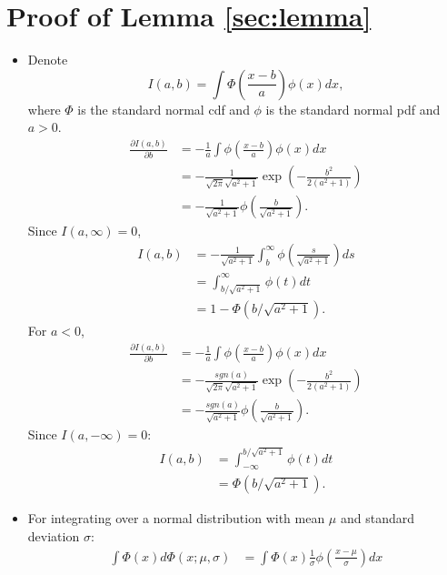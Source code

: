 \documentclass[12pt]{article}
\begin{document}
\section{Proof of Lemma \ref{sec:lemma}}
\label{sec:proof}
\begin{itemize}
\item Denote
  \begin{displaymath}
    I(a,b) = \int \Phi \left( \frac{x-b}{a} \right)\phi(x) dx ,
  \end{displaymath}
  where $\Phi$ is the standard normal cdf and $\phi$ is the standard
  normal pdf and $a > 0$.
  \begin{align*}
    \frac{\partial I(a,b)}{\partial b} & = - \frac{1}{a} \int \phi \left( \frac{x-b}{a} \right) \phi(x) dx \\
    & = - \frac{1}{\sqrt{2 \pi} \sqrt{a^2+1}} \exp \left( - \frac{b^2}{2(a^2+1)} \right)\\
    & = -\frac{1}{\sqrt{a^2+1}} \phi \left( \frac{b}{\sqrt{a^2+1}}
    \right).
  \end{align*}
  Since $I(a, \infty) = 0$,
  \begin{align}
    I(a,b) &= - \frac{1}{\sqrt{a^2+1}} \int_b^{\infty} \phi \left( \frac{s}{\sqrt{a^2+1}} \right) ds \nonumber \\
    &= \int_{b/\sqrt{a^2+1}}^{\infty} \phi(t) dt \nonumber\\
    \label{eq:int}
    & = 1- \Phi(b/\sqrt{a^2+1}).
  \end{align}
  For $a < 0$,
  \begin{align*}
    \frac{\partial I(a,b)}{\partial b} & = - \frac{1}{a} \int \phi \left( \frac{x-b}{a} \right) \phi(x) dx \\
    & = - \frac{sgn(a)}{\sqrt{2 \pi} \sqrt{a^2+1}} \exp \left( - \frac{b^2}{2(a^2+1)} \right)\\
    & = -\frac{sgn(a)}{\sqrt{a^2+1}} \phi \left(
      \frac{b}{\sqrt{a^2+1}} \right).
  \end{align*}
  Since $I(a, -\infty) = 0$:
  \begin{align}
    I(a,b) &= \int^{b/\sqrt{a^2+1}}_{-\infty} \phi(t) dt \nonumber\\
    \label{eq:intneg}
    & = \Phi(b/\sqrt{a^2+1}).
  \end{align}
\item For integrating over a normal distribution with mean $\mu$ and
  standard deviation $\sigma$:
  \begin{align*}
    \int \Phi(x)d\Phi(x; \mu, \sigma) & = \int \Phi(x) \frac{1}{\sigma} \phi \left( \frac{x-\mu}{\sigma} \right) dx \\

\end{align*}
\end{itemize}
\end{document}

